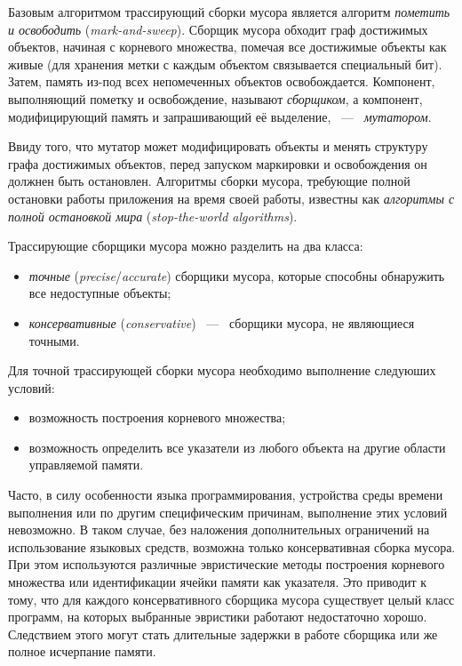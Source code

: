 Базовым алгоритмом трассирующий сборки мусора является алгоритм 
\emph{пометить и освободить} (\emph{mark-and-sweep}). 
Сборщик мусора обходит граф достижимых объектов, начиная с корневого множества, 
помечая все достижимые объекты как живые (для хранения метки с каждым объектом 
связывается специальный бит). 
Затем, память из-под всех непомеченных объектов освобождается. 
Компонент, выполняющий пометку и освобождение, называют \emph{сборщиком}, 
а компонент, модифицирующий память и запрашивающий её выделение, ~---~ \emph{мутатором}. 

Ввиду того, что мутатор может модифицировать объекты и менять структуру графа 
достижимых объектов, перед запуском маркировки и освобождения он должнен быть остановлен. 
Алгоритмы сборки мусора, требующие полной остановки работы приложения на время своей работы, 
известны как \emph{алгоритмы с полной остановкой мира} (\emph{stop-the-world algorithms}).

Трассирующие сборщики мусора можно разделить на два класса:
\begin{itemize}
\item 
	\emph{точные} (\emph{precise}/\emph{accurate}) сборщики мусора, 
	которые способны обнаружить все недоступные объекты;
\item 
	\emph{консервативные} (\emph{conservative}) ~---~ сборщики мусора, 
	не являющиеся точными.
\end{itemize}

Для точной трассирующей сборки мусора необходимо выполнение следуюших условий:
\begin{itemize}
\item 
	возможность построения корневого множества;
\item 
	возможность определить все указатели из любого объекта на другие области 
	управляемой памяти.
\end{itemize}

Часто, в силу особенности языка программирования, устройства среды 
времени выполнения или по другим специфическим причинам, выполнение этих 
условий невозможно. 
В таком случае, без наложения дополнительных ограничений на использование 
языковых 
средств, возможна только консервативная сборка мусора. 
При этом используются различные эвристические методы построения корневого множества 
или идентификации ячейки памяти как указателя. 
Это приводит к тому, что для каждого консервативного сборщика мусора существует целый класс 
программ, на которых выбранные эвристики работают недостаточно хорошо\cite{boehm1993space}. 
Следствием этого могут стать длительные задержки в работе сборщика или же полное исчерпание 
памяти.


